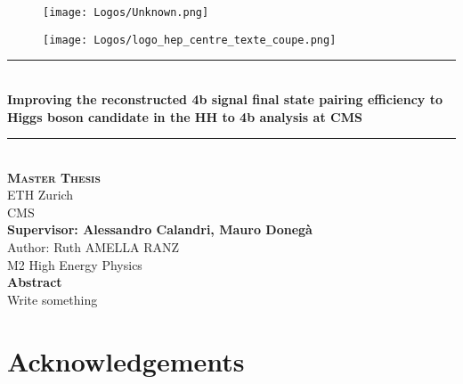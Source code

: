 \documentclass[11pt]{article}
\begin{document}
\begin{titlepage}
\newcommand{\HRule}{\rule{\linewidth}{0.5mm}}
\begin{figure}[H]
\noindent
\begin{minipage}{.5\textwidth}
\begin{flushleft}
    \texttt{[image: Logos/Unknown.png]}
\end{flushleft}
\end{minipage}
\begin{minipage}{.5\textwidth}
\begin{flushright}
\texttt{[image: Logos/logo\_hep\_centre\_texte\_coupe.png]}
\end{flushright}
\end{minipage}

\end{figure}
\center
\HRule \\[0.4cm]
{ \huge \bfseries  Improving the reconstructed 4b signal final state pairing efficiency to Higgs boson candidate in the HH to 4b analysis at CMS
 \\[0.15cm] }
 \HRule \\[0.5cm]
 \center 
\textsc{\LARGE\textbf{Master Thesis}}\\[1cm]
{\Large ETH Zurich}\\[0.5cm]
{\Large CMS}\\[1cm]

{\large\textbf{Supervisor: Alessandro Calandri, Mauro Donegà}}\\[1cm]
Author: Ruth AMELLA RANZ\\
M2 High Energy Physics
\\[1cm]
\textbf{Abstract}\\[1cm]
\justifying
Write something


\end{titlepage}

\newpage
{}
\tableofcontents
{}
\pagestyle{fancy}
\fancyhf{}
\fancyhead[L]{\rightmark}
\fancyfoot[C]{\thepage}
\setlength{\headheight}{13.59999pt}
\addtolength{\topmargin}{-1.59999pt}
\setlength{\headheight}{25.22153pt}
\addtolength{\topmargin}{-11.62154pt}

\newpage













\section*{Acknowledgements}
\end{document}
